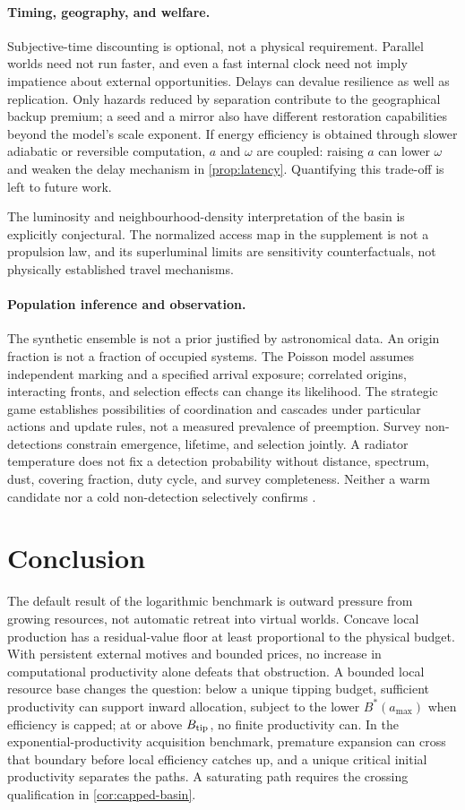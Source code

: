 \paragraph{Timing, geography, and welfare.}
Subjective-time discounting is optional, not a physical requirement.
Parallel worlds need not run faster, and even a fast internal clock need
not imply impatience about external opportunities. Delays can devalue
resilience as well as replication. Only hazards reduced by separation
contribute to the geographical backup premium; a seed and a mirror also
have different restoration capabilities beyond the model's scale exponent.
If energy efficiency is obtained through slower adiabatic or reversible
computation, $a$ and $\omega$ are coupled: raising $a$ can lower $\omega$
and weaken the delay mechanism in \cref{prop:latency}. Quantifying this
trade-off is left to future work.

The luminosity and neighbourhood-density interpretation of the basin is
explicitly conjectural. The normalized access map in the supplement is
not a propulsion law, and its superluminal limits are sensitivity
counterfactuals, not physically established travel mechanisms.

\paragraph{Population inference and observation.}
The synthetic ensemble is not a prior justified by astronomical data.
An origin fraction is not a fraction of occupied systems. The Poisson
model assumes independent marking and a specified arrival exposure;
correlated origins, interacting fronts, and selection effects can change
its likelihood. The strategic game establishes possibilities of
coordination and cascades under particular actions and update rules,
not a measured prevalence of preemption. Survey non-detections constrain
emergence, lifetime, and selection jointly. A radiator temperature does
not fix a detection probability without distance, spectrum, dust,
covering fraction, duty cycle, and survey completeness. Neither a warm
candidate nor a cold non-detection selectively confirms \CITH.

\section{Conclusion}
\label{sec:conclusion}
The default result of the logarithmic benchmark is outward pressure from
growing resources, not automatic retreat into virtual worlds. Concave
local production has a residual-value floor at least proportional to
the physical budget. With persistent external motives and bounded prices,
no increase in computational productivity alone defeats that obstruction.
A bounded local resource base changes the question: below a unique tipping
budget, sufficient productivity can support inward allocation, subject to
the lower $B^*(a_{\max})$ when efficiency is capped; at or above
$B_{\rm tip}$, no finite productivity can. In the exponential-productivity acquisition benchmark,
premature expansion can cross that boundary before local efficiency
catches up, and a unique critical initial productivity separates the paths.
A saturating path requires the crossing qualification in \cref{cor:capped-basin}.

